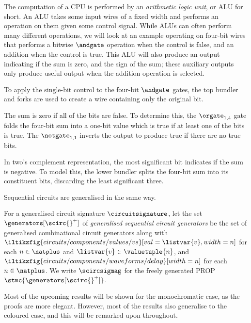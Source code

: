 \documentclass{lmcs}
\begin{document}
\begin{exa}[ALU]
    The computation of a CPU is performed by an \emph{arithmetic logic unit},
    or ALU for short.
    An ALU takes some input wires of a fixed width and performs an operation
    on them given some control signal.
    While ALUs can often perform many different operations, we will look at an
    example operating on four-bit wires that performs a bitwise \(\andgate\)
    operation when the control is false, and an addition when the control is
    true.
    This ALU will also produce an output indicating if the sum is zero, and
    the sign of the sum; these auxiliary outputs only produce useful output when
    the addition operation is selected.

    \begin{center}
    \end{center}

    To apply the single-bit control to the four-bit \(\andgate\) gates, the
    top bundler and forks are used to create a wire containing only the
    original bit.

    The sum is zero if all of the bits are false.
    To determine this, the \(\orgate_{1,4}\) gate folds the four-bit sum into
    a one-bit value which is true if at least one of the bits is true.
    The \(\notgate_{1,1}\) inverts the output to produce true if there are no
    true bits.

    In two's complement representation, the most significant bit indicates if
    the sum is negative.
    To model this, the lower bundler splits the four-bit sum into its
    constituent bits, discarding the least significant three.
\end{exa}

Sequential circuits are generalised in the same way.

\begin{defi}
    For a generalised circuit signature \(\circuitsignature\), let the set
    \(\generators[\scirc{}^+]\) of
    \emph{generalised sequential circuit generators} be the set of
    generalised combinational circuit generators along with
    \(
    \iltikzfig{circuits/components/values/vs}[val=\listvar{v},width=n]
    \) for each \(n \in \natplus\) and \(\listvar{v} \in \valuetuple{n}\), and
    \(
    \iltikzfig{circuits/components/waveforms/delay}[width=n]
    \) for each \(n \in \natplus\).
    We write \(\scircsigmag\) for the freely generated PROP
    \(\stmc{\generators[\scirc{}^+]}\).
\end{defi}

Most of the upcoming results will be shown for the monochromatic case, as the
proofs are more elegant.
However, most of the results also generalise to the coloured case, and this will
be remarked upon throughout.



\end{document}
